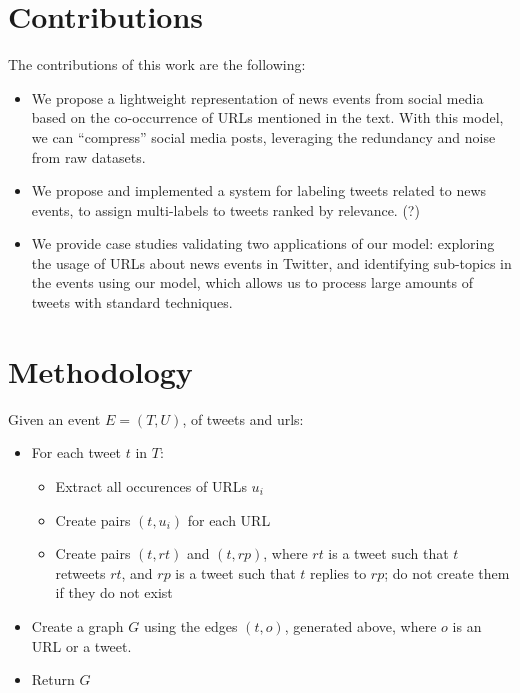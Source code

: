 \documentclass{article}
\begin{document}
\section{Contributions}

The contributions of this work are the following:

\begin{itemize}
\item We propose a lightweight representation of news events from
  social media based on the co-occurrence of URLs mentioned in the
  text. With this model, we can ``compress'' social media posts,
  leveraging the redundancy and noise from raw datasets.
  
\item We propose and implemented a system for labeling tweets related
  to news events, to assign multi-labels to tweets ranked by relevance. (?)

\item We provide case studies validating two applications of our
  model: exploring the usage of URLs about news events in Twitter, and
  identifying sub-topics in the events using our model, which allows
  us to process large amounts of tweets with standard techniques.
  
\end{itemize}







\section{Methodology}

Given an event $E=(T, U)$, of tweets and urls:

\begin{itemize}
\item For each tweet $t$ in $T$:
  \begin{itemize}
  \item Extract all occurences of URLs $u_i$
  \item Create pairs $(t, u_i)$ for each URL
  \item Create pairs $(t, rt)$ and $(t, rp)$, where $rt$ is a tweet
    such that $t$ retweets $rt$, and $rp$ is a tweet such that $t$
    replies to $rp$; do not create them if they do not exist
  \end{itemize}
\item Create a graph $G$ using the edges $(t, o)$, generated above,
  where $o$ is an URL or a tweet.
\item Return $G$
\end{itemize}
\end{document}
